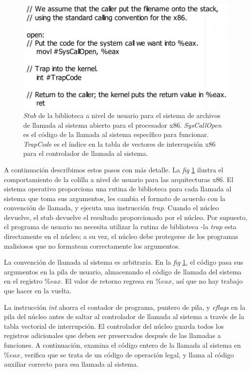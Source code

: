 \documentclass[10pt]{book}
\begin{document}
\begin{figure}[tbhp]
\centerline{\includegraphics[scale=0.45]{img/fig11}}
\caption{\textit{Stub} de la biblioteca a nivel de usuario para el sistema de archivos de llamada al sistema abierto para el procesador x$86$. \textit{SysCallOpen} es el código de la llamada al sistema específico para funcionar. \textit{TrapCode} es el índice en la tabla de vectores de interrupción x$86$ para el controlador de llamada al sistema.}
\label{fig11}
\end{figure}

A continuación describimos estos pasos con más detalle. La \textit{fig} \ref{fig11} ilustra el comportamiento de la colilla a nivel de usuario para las arquitecturas x$86$. El sistema operativo proporciona una rutina de biblioteca para cada llamada al sistema que toma sus argumentos, les cambia el formato de acuerdo con la convención de llamada, y ejecuta una instrucción \textit{trap}. Cuando el núcleo devuelve, el stub devuelve el resultado proporcionado por el núcleo. Por supuesto, el programa de usuario no necesita utilizar la rutina de biblioteca -la \textit{trap} esta directamente en el núcleo; a su vez, el núcleo debe protegerse de los programas malisiosos que no formatean correctamente los argumentos.

La convención de llamada al sistema es arbitraria. En la \textit{fig} \ref{fig11}, el código pasa sus argumentos en la pila de usuario, almacenando el código de llamada del sistema en el registro $\% eax$. El valor de retorno regresa en $\% eax$, así que no hay trabajo que hacer en la vuelta.

La instrucción \textit{int} ahorra el contador de programa, puntero de pila, y \textit{eflags} en la pila del núcleo antes de saltar al controlador de llamada al sistema a través de la tabla vectorial de interrupción. El controlador del núcleo guarda todos los registros adicionales que deben ser preservados después de las llamadas a funciones. A continuación, examina el código entero de la  llamada al sistema en $\% eax$, verifica que se trata de un código de operación legal, y llama al código auxiliar correcto para esa llamada al sistema.
\end{document}
